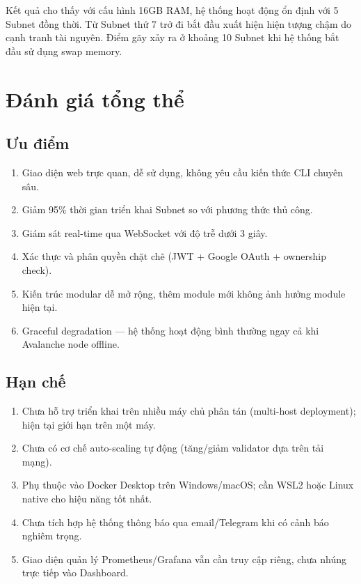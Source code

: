 Kết quả cho thấy với cấu hình 16GB RAM, hệ thống hoạt động ổn định với 5 Subnet đồng thời. Từ Subnet thứ 7 trở đi bắt đầu xuất hiện hiện tượng chậm do cạnh tranh tài nguyên. Điểm gãy xảy ra ở khoảng 10 Subnet khi hệ thống bắt đầu sử dụng swap memory.

\section{Đánh giá tổng thể}

\subsection{Ưu điểm}

\begin{enumerate}
    \item Giao diện web trực quan, dễ sử dụng, không yêu cầu kiến thức CLI chuyên sâu.
    \item Giảm 95\% thời gian triển khai Subnet so với phương thức thủ công.
    \item Giám sát real-time qua WebSocket với độ trễ dưới 3 giây.
    \item Xác thực và phân quyền chặt chẽ (JWT + Google OAuth + ownership check).
    \item Kiến trúc modular dễ mở rộng, thêm module mới không ảnh hưởng module hiện tại.
    \item Graceful degradation --- hệ thống hoạt động bình thường ngay cả khi Avalanche node offline.
\end{enumerate}

\subsection{Hạn chế}

\begin{enumerate}
    \item Chưa hỗ trợ triển khai trên nhiều máy chủ phân tán (multi-host deployment); hiện tại giới hạn trên một máy.
    \item Chưa có cơ chế auto-scaling tự động (tăng/giảm validator dựa trên tải mạng).
    \item Phụ thuộc vào Docker Desktop trên Windows/macOS; cần WSL2 hoặc Linux native cho hiệu năng tốt nhất.
    \item Chưa tích hợp hệ thống thông báo qua email/Telegram khi có cảnh báo nghiêm trọng.
    \item Giao diện quản lý Prometheus/Grafana vẫn cần truy cập riêng, chưa nhúng trực tiếp vào Dashboard.
\end{enumerate}
